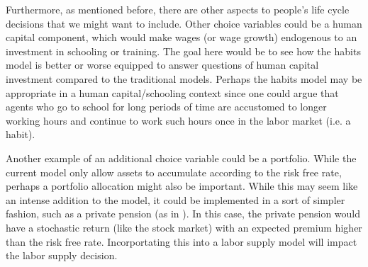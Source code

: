 \documentclass[ProjectMMD]{subfiles}
\begin{document}
Furthermore, as mentioned before, there are other aspects to people's life cycle decisions that we might want to include. Other choice variables could be a human capital component, which would make wages (or wage growth) endogenous to an investment in schooling or training. The goal here would be to see how the habits model is better or worse equipped to answer questions of human capital investment compared to the traditional models. Perhaps the habits model may be appropriate in a human capital/schooling context since one could argue that agents who go to school for long periods of time are accustomed to longer working hours and continue to work such hours once in the labor market (i.e. a habit).

Another example of an additional choice variable could be a portfolio. While the current model only allow assets to accumulate according to the risk free rate, perhaps a portfolio allocation might also be important. While this may seem like an intense addition to the model, it could be implemented in a sort of simpler fashion, such as a private pension (as in \cite{keane2016labour}). In this case, the private pension would have a stochastic return (like the stock market) with an expected premium higher than the risk free rate. Incorportating this into a labor supply model will impact the labor supply decision.






\onlyinsubfile{}
%
\end{document}
